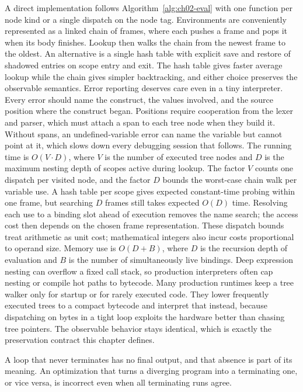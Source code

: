 A direct implementation follows Algorithm~\ref{alg:ch02-eval} with one function per node kind or a single dispatch on the node tag.
Environments are conveniently represented as a linked chain of frames, where each  pushes a frame and pops it when its body finishes.
Lookup then walks the chain from the newest frame to the oldest.
An alternative is a single hash table with explicit save and restore of shadowed entries on scope entry and exit.
The hash table gives faster average lookup while the chain gives simpler backtracking, and either choice preserves the observable semantics.
Error reporting deserves care even in a tiny interpreter.
Every error should name the construct, the values involved, and the source position where the construct began.
Positions require cooperation from the lexer and parser, which must attach a span to each tree node when they build it.
Without spans, an undefined-variable error can name the variable but cannot point at it, which slows down every debugging session that follows.
The running time is $O(V \cdot D)$, where $V$ is the number of executed tree nodes and $D$ is the maximum nesting depth of scopes active during lookup.
The factor $V$ counts one dispatch per visited node, and the factor $D$ bounds the worst-case chain walk per variable use.
A hash table per scope gives expected constant-time probing within one frame, but searching $D$ frames still takes expected $O(D)$ time.
Resolving each use to a binding slot ahead of execution removes the name search; the access cost then depends on the chosen frame representation.
These dispatch bounds treat arithmetic as unit cost; mathematical integers also incur costs proportional to operand size.
Memory use is $O(D + B)$, where $D$ is the recursion depth of evaluation and $B$ is the number of simultaneously live bindings.
Deep expression nesting can overflow a fixed call stack, so production interpreters often cap nesting or compile hot paths to bytecode.
Many production runtimes keep a tree walker only for startup or for rarely executed code.
They lower frequently executed trees to a compact bytecode and interpret that instead, because dispatching on bytes in a tight loop exploits the hardware better than chasing tree pointers.
The observable behavior stays identical, which is exactly the preservation contract this chapter defines.
\begin{ccwarning}
A loop that never terminates has no final output, and that absence is part of its meaning.
An optimization that turns a diverging program into a terminating one, or vice versa, is incorrect even when all terminating runs agree.
\end{ccwarning}

